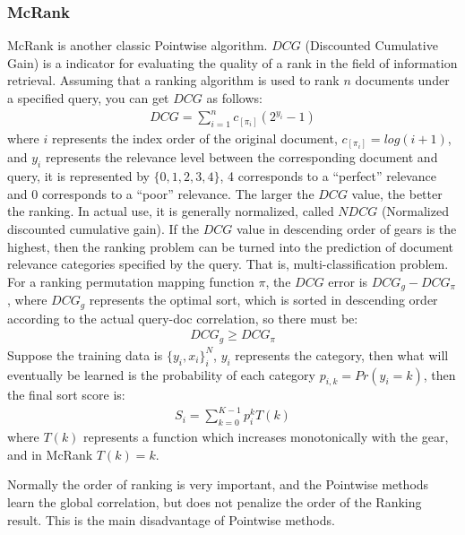 \subsubsection{McRank}
McRank is another classic Pointwise algorithm. $DCG$ (Discounted Cumulative Gain) is a indicator for evaluating the quality of a rank in the field of information retrieval. Assuming that a ranking algorithm is used to rank $ n $ documents under a specified query, you can get $DCG$ as follows:
\begin{equation}
\begin{aligned}
DCG=\sum_{i=1}^{n}c_{[\pi_i]}(2^{y_i}-1)
\end{aligned}
\label{eqn:eq3}
\end{equation}
where $ i $ represents the index order of the original document, $ c_ {[\pi_i]} = log (i + 1) $, and $ y_i $ represents the relevance level between the corresponding document and query, it is represented by $ \{0, 1, 2,3,4 \} $, 4 corresponds to a “perfect” relevance and 0 corresponds to a “poor” relevance. The larger the $DCG$ value, the better the ranking. In actual use, it is generally normalized, called $NDCG$ (Normalized discounted cumulative gain). If the $DCG$ value in descending order of gears is the highest, then the ranking problem can be turned into the prediction of document relevance categories specified by the query. That is, multi-classification problem.
For a ranking permutation mapping function $ \pi $, the $DCG$ error is $ DCG_g-DCG _ {\pi} $, where $ DCG_g $ represents the optimal sort, which is sorted in descending order according to the actual query-doc correlation, so there must be:
\begin{equation}
\begin{aligned}
DCG_g \geq DCG _ {\pi} 
\end{aligned}
\label{eqn:eq4}
\end{equation}
Suppose the training data is $\{y_i,x_i\}_i^N$, $y_i$ represents the category, then what will eventually be learned is the probability of each category $p_{i,k}=Pr(y_i=k)$, then the final sort score is:
\begin{equation}
\begin{aligned}
S_i=\sum_{k=0}^{K-1}p_i^kT(k)
\end{aligned}
\label{eqn:eq5}
\end{equation}
where $ T (k) $ represents a function which increases monotonically with the gear, and in McRank $ T (k) =  k $.

Normally the order of ranking is very important, and the Pointwise methods learn the global correlation, but does not penalize the order of the Ranking result. This is the main disadvantage of Pointwise methods.

